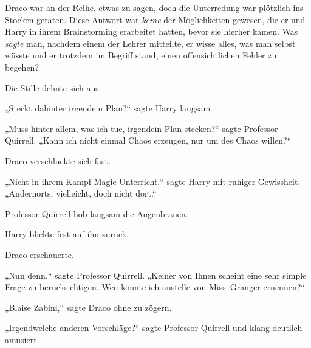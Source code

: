Draco war an der Reihe, etwas zu sagen, doch die Unterredung war plötzlich ins Stocken geraten. Diese Antwort war \emph{keine} der Möglichkeiten gewesen, die er und Harry in ihrem Brainstorming erarbeitet hatten, bevor sie hierher kamen. Was \emph{sagte} man, nachdem einem der Lehrer mitteilte, er wisse alles, was man selbst wüsste und er trotzdem im Begriff stand, einen offensichtlichen Fehler zu begehen?

Die Stille dehnte sich aus.

„Steckt dahinter irgendein Plan?“ sagte Harry langsam.

„Muss hinter allem, was ich tue, irgendein Plan stecken?“ sagte Professor Quirrell. „Kann ich nicht einmal Chaos erzeugen, nur um des Chaos willen?“

Draco verschluckte sich fast.

„Nicht in ihrem Kampf-Magie-Unterricht,“ sagte Harry mit ruhiger Gewissheit. „Andernorts, vielleicht, doch nicht dort.“

Professor Quirrell hob langsam die Augenbrauen.

Harry blickte fest auf ihn zurück.

Draco erschauerte.

„Nun denn,“ sagte Professor Quirrell. „Keiner von Ihnen scheint eine sehr simple Frage zu berücksichtigen. Wen könnte ich anstelle von Miss~Granger ernennen?“

„Blaise Zabini,“ sagte Draco ohne zu zögern.

„Irgendwelche anderen Vorschläge?“ sagte Professor Quirrell und klang deutlich amüsiert.

